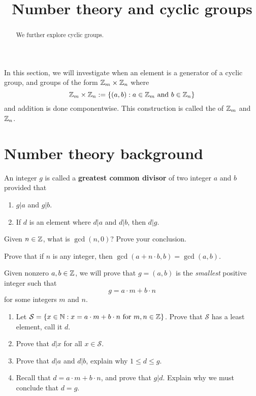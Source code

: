 \documentclass{ximera}
\title{Number theory and cyclic groups}
\begin{document}
\begin{abstract}
  We further explore cyclic groups.
\end{abstract}
\maketitle

In this section, we will investigate when an element is a generator of
a cyclic group, and groups of the form $\mathbb Z_m\times \mathbb Z_n$ where
\[
\mathbb Z_m\times \mathbb Z_n :=\{(a,b):\text{$a\in\mathbb Z_m$ and $b\in\mathbb Z_n$}\}
\]
and addition is done componentwise. This construction is called the
 of $\mathbb Z_m$ and $\mathbb Z_n$.




\section{Number theory background}

\begin{definition} 
An integer $g$ is called a \textbf{greatest common divisor} of two
integer $a$ and $b$ provided that
\begin{enumerate}
\item $g| a$ and $g | b$.
\item If $d$ is an element where $d| a$ and $d | b$, then $d| g$.
\end{enumerate}
\end{definition}

\begin{exercise} 
Given $n\in \mathbb Z$, what is $\gcd(n,0)$? Prove your conclusion.
\end{exercise}

\begin{exercise} 
Prove that if $n$ is any integer, then $\gcd(a + n\cdot b, b) = \gcd(a, b)$.
\end{exercise}




\begin{theorem}\label{E:EL1}
  Given nonzero $a,b\in\mathbb Z$, we will prove that $g=(a,b)$ is the
  \textit{smallest} positive integer such that
  \[
  g = a\cdot m +b\cdot n
  \]
  for some integers $m$ and $n$.
  \begin{enumerate}
  \item Let $\mathcal S = \{x\in \mathbb N: x = a\cdot m +b\cdot n\text{ for } m,n\in
    \mathbb Z\}$. Prove that $\mathcal S$ has a least element, call it $d$.
  \item Prove that $d| x$ for all $x\in \mathcal S$.
  \item Prove that $d| a$ and $d| b$, explain why $1 \le d \le g$.
  \item Recall that $d = a\cdot m +b\cdot n$, and prove that $g |
    d$. Explain why we must conclude that $d = g$.
  \end{enumerate}
\end{theorem}
\end{document}
